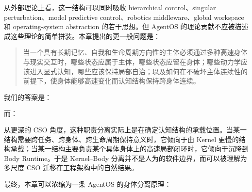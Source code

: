 从外部理论上看，这一结构可以同时吸收 hierarchical control、singular perturbation、model predictive control、robotics middleware、global workspace 和 operating-system abstraction 的若干思想。但 AgentOS 的理论贡献不应被描述成这些理论的简单拼装。本章提出的更一般问题是：

\begin{quote}
当一个具有长期记忆、自我和生命周期方向性的主体必须通过多种高速身体与现实交互时，哪些状态应属于主体，哪些状态应留在身体；哪些动力学应该进入显式认知，哪些应该保持局部自治；以及如何在不破坏主体连续性的前提下，使身体能够高速变化而认知结构保持跨身体连续。
\end{quote}

我们的答案是：

\begin{statementbox}
\centering
{}
\end{statementbox}

\begin{statementbox}
\centering
{}
\end{statementbox}

\begin{statementbox}
\centering
{}
\end{statementbox}

而：

\begin{statementbox}
\centering
{}
\end{statementbox}

\begin{statementbox}
\centering
{}
\end{statementbox}

从更深的 CSO 角度，这种职责分离实际上是在确定认知结构的承载位置。当某一结构需要跨任务、跨身体、跨生命周期保持意义时，它倾向于由 Kernel 更慢的结构承载；当某一结构主要负责某个具体身体上的高速局部闭环时，它倾向于沉降到 Body Runtime。于是 Kernel--Body 分离并不是人为的软件边界，而可以被理解为多尺度 CSO 迁移在工程架构中的自然结果。

最终，本章可以浓缩为一条 AgentOS 的身体分离原理：

